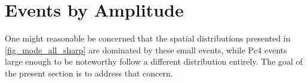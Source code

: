 






\section{Events by Amplitude}
  \label{sec_amp}

One might reasonable be concerned that the spatial distributions presented in \cref{fig_mode_all_sharp} are dominated by these small events, while Pc4 events large enough to be noteworthy follow a different distribution entirely. The goal of the present section is to address that concern. 

